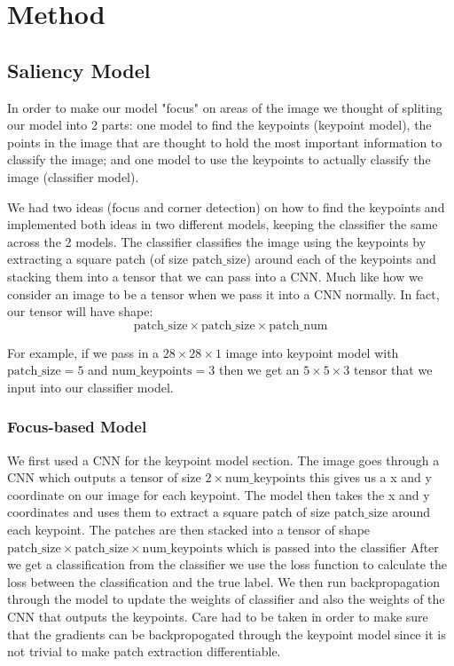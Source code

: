 \section{Method}

\subsection{Saliency Model}
In order to make our model "focus" on areas of the image we thought of spliting our model into 2 parts: one model to find the keypoints (keypoint model), the points in the image that are thought to hold the most important information to classify the image; and one model to use the keypoints to actually classify the image (classifier model).

We had two ideas (focus and corner detection) on how to find the keypoints and implemented both ideas in two different models, keeping the classifier the same across the 2 models. The classifier classifies the image using the keypoints by extracting a square patch (of size \(\text{patch\_size}\)) around each of the keypoints and stacking them into a tensor that we can pass into a CNN. Much like how we consider an image to be a tensor when we pass it into a CNN normally. In fact, our tensor will have shape: \[\text{patch\_size} \times \text{patch\_size} \times \text{patch\_num}\]

For example, if we pass in a \(28 \times 28 \times 1\) image into keypoint model with \(\text{patch\_size} = 5\) and \(\text{num\_keypoints} = 3\) then we get an \(5 \times 5 \times 3\) tensor that we input into our classifier model.

\subsubsection{Focus-based Model}
We first used a CNN for the keypoint model section. The image goes through a CNN which outputs a tensor of size \(2 \times \text{num\_keypoints}\) this gives us a x and y coordinate on our image for each keypoint. The model then takes the x and y coordinates and uses them to extract a square patch of size \(\text{patch\_size}\) around each keypoint. The patches are then stacked into a tensor of shape \(\text{patch\_size} \times \text{patch\_size} \times \text{num\_keypoints}\) which is passed into the classifier After we get a classification from the classifier we use the loss function to calculate the loss between the classification and the true label. We then run backpropagation through the model to update the weights of classifier and also the weights of the CNN that outputs the keypoints. Care had to be taken in order to make sure that the gradients can be backpropogated through the keypoint model since it is not trivial to make patch extraction differentiable. 

